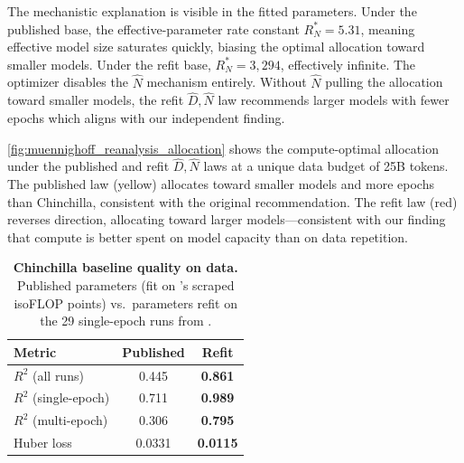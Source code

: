 The mechanistic explanation is visible in the fitted parameters. Under the published base, the effective-parameter rate constant $R_N^* = 5.31$, meaning effective model size saturates quickly, biasing the optimal allocation toward smaller models. Under the refit base, $R_N^* = 3{,}294$, effectively infinite. The optimizer disables the $\widehat{N}$ mechanism entirely. Without $\widehat{N}$ pulling the allocation toward smaller models, the refit $\widehat{D}, \widehat{N}$ law recommends larger models with fewer epochs which aligns with our independent finding.



 \autoref{fig:muennighoff_reanalysis_allocation} shows the compute-optimal allocation under the published and refit $\widehat{D}, \widehat{N}$ laws at a unique data budget of 25B tokens. The published law (yellow) allocates toward smaller models and more epochs than Chinchilla, consistent with the original recommendation. The refit law (red) reverses direction, allocating toward larger models---consistent with our finding that compute is better spent on model capacity than on data repetition.

\begin{table}[t]
    \centering
    \caption{\textbf{Chinchilla baseline quality on \citet{muennighoff2023scaling} data.} Published parameters (fit on \citet{hoffmann2022training}'s scraped isoFLOP points) vs.\ parameters refit on the 29 single-epoch runs from \citet{muennighoff2023scaling}.}
    \label{tab:chinchilla_baseline_quality}
    \begin{tabular}{lcc}
        \toprule
        Metric & Published & Refit \\
        \midrule
        $R^2$ (all runs) & 0.445 & \textbf{0.861} \\
        $R^2$ (single-epoch) & 0.711 & \textbf{0.989} \\
        $R^2$ (multi-epoch) & 0.306 & \textbf{0.795} \\
        Huber loss & 0.0331 & \textbf{0.0115} \\
        \bottomrule
    \end{tabular}
\end{table}

